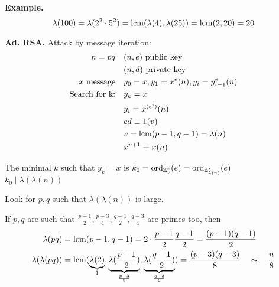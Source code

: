 \textbf{Example.}
\[
  \lambda(100) = \lambda(2^2 \cdot 5^2) = \operatorname{lcm}(\lambda(4), \lambda(25)) = \operatorname{lcm}(2,20) = 20
\]

\textbf{Ad. RSA.}
Attack by message iteration:
\begin{align*}
  n = pq               & \quad (n,e) \text{ public key}\\
                       & \quad (n,d) \text{ private key}\\
  x \text{ message}    & \quad y_0 = x, y_1 = x^e (n), y_i = y_{i-1}^{e} (n)\\
  \text{Search for k:} & \quad y_k = x\\
                       & \quad y_i = x^{(e^i)} (n)\\
                       & \quad ed \equiv 1 (v)\\
                       & \quad v = \operatorname{lcm}(p-1, q-1) = \lambda(n)\\
                       & \quad x ^{v+1} \equiv x (n)
\end{align*}

The minimal $k$ such that $ y_k = x$ is $k_0 = \operatorname{ord}_{\mathbb{Z}_v^{*}}(e) = \operatorname{ord}_{\mathbb{Z}_{\lambda(n)}^{*}}(e)$ \\
$k_0 \mid \lambda(\lambda(n))$

Look for $p,q$ such that $\lambda(\lambda(n))$ is large.

If $p,q$ are such that $\frac{p-1}{2}, \frac{p-3}{4}, \frac{q-1}{2}, \frac{q-3}{4}$ are primes too,
then
\begin{align*}
 \lambda(pq) &= \operatorname{lcm}(p-1, q-1) = 2 \cdot \frac{p-1}{2} \frac{q-1}{2} = \frac{(p-1)(q-1)}{2} \\
  \lambda(\lambda(pq)) &= \operatorname{lcm}(\underbrace{\lambda(2)}_{1}, \underbrace{\lambda( \frac{p-1}{2} )}_{\frac{p-3}{2}}, \underbrace{\lambda( \frac{q-1}{2} )}_{\frac{q-3}{2}}) = \frac{(p-3)(q-3)}{8} \quad \sim \quad \frac{n}{8}
\end{align*}
